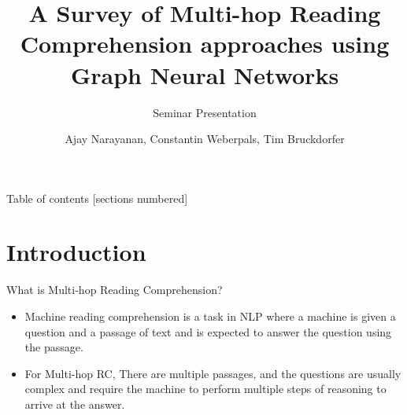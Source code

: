 \documentclass[10pt]{beamer}
\title{A Survey of Multi-hop Reading Comprehension approaches using Graph Neural Networks}
\subtitle{Seminar Presentation}
\date{}
\author{Ajay Narayanan, Constantin Weberpals, Tim Bruckdorfer}
\institute{Technical University of Munich}
\newcommand{\themename}{\textbf{\textsc{metropolis}}\xspace}
\begin{document}
\maketitle

\begin{frame}{Table of contents}
  [sections numbered]
  \tableofcontents%
\end{frame}

\section[Intro]{Introduction}

\begin{frame}[fragile]{What is Multi-hop Reading Comprehension?}




  \begin{itemize}
    \item Machine reading comprehension is a task in NLP where a machine is given a question and a passage of text and is expected to answer the question using the passage.
    \item For Multi-hop RC, There are multiple passages, and the questions are usually complex and require the machine to perform multiple steps of reasoning to arrive at the answer.
    
  \end{itemize}
\end{frame}
\end{document}
